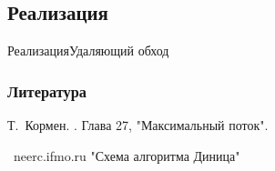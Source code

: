 \documentclass{beamer}
\begin{document}
\subsection{Реализация}
\begin{frame}{Реализация}{Удаляющий обход}

\end{frame}

\begin{frame}[allowframebreaks]
  \frametitle<presentation>{Литература}

  \begin{thebibliography}{10}

  \beamertemplatebookbibitems

    Т.~Кормен.
    .
    \newblock Глава 27, "Максимальный поток".


  \beamertemplatearticlebibitems

  \bibitem{}
      ~neerc.ifmo.ru
      \newblock "Схема алгоритма Диница"
  \end{thebibliography}
\end{frame}
\end{document}
